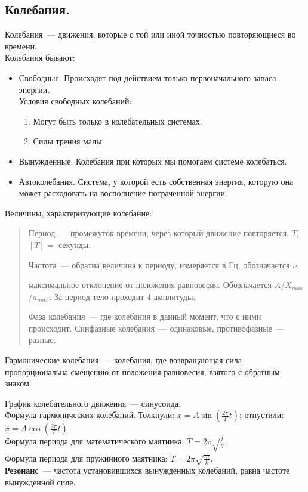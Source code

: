 \documentclass{article}
\begin{document}
	\subsection{Колебания.}
	\begin{definition}
		Колебания~--- движения, которые с той или иной точностью повторяющиеся во времени. \\
		Колебания бывают:
		\begin{itemize}
			\item Свободные. Происходят под действием только первоначального запаса энергии. \\
			Условия свободных колебаний:
			\begin{enumerate}
				\item Могут быть только в колебательных системах.
				\item Силы трения малы.
			\end{enumerate}
			\item Вынужденные. Колебания при которых мы помогаем системе колебаться.
			\item Автоколебания. Система, у которой есть собственная энергия, которую она может расходовать на восполнение потраченной энергии.
		\end{itemize}
	\end{definition}
	\begin{definition}
		Величины, характеризующие колебание:
		\begin{quote}
			\begin{definition}
				Период~--- промежуток времени, через который движение повторяется. $T$, $[T] =$ секунды.
			\end{definition}
			\begin{definition}
				Частота~--- обратна величина к периоду, измеряется в Гц, обозначается $\nu$.
			\end{definition}
			\begin{definition}
				максимальное отклонение от положения равновесия. Обозначается $A$/$X_{max}$/$a_{max}$. За период тело проходит $4$ амплитуды.
			\end{definition}
			\begin{definition}
				Фаза колебания~--- где колебания в данный момент, что с ними происходит. Синфазные колебания~--- одинаковые, противофазные~--- разные.
			\end{definition}
		\end{quote}
	\end{definition}
	\begin{definition}
		Гармонические колебания~--- колебания, где возвращающая сила пропорциональна смещению от положения равновесия, взятого с обратным знаком.
	\end{definition}
	\noindent
	График колебательного движения~--- синусоида. \\
	Формула гармонических колебаний. Толкнули: $x = A \sin (\frac{2\pi}{T} t)$; отпустили: $x = A \cos (\frac{2\pi}{T} t)$. \\
	Формула периода для математического маятника: $T = 2\pi\sqrt{\frac{l}{g}}$. \\
	Формула периода для пружинного маятника: $T = 2\pi\sqrt{\frac{m}{k}}$. \\
	\textbf{Резонанс}~--- частота установившихся вынужденных колебаний, равна частоте вынужденной силе.
\end{document}
